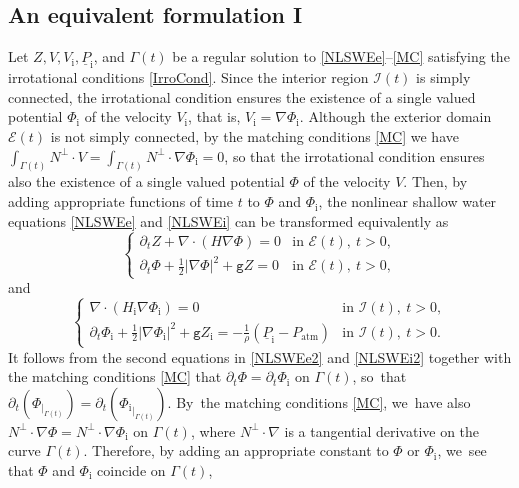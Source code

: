 \documentclass[JEP,XML,SOM,Unicode,NoFloatCountersInSection,published]{cedram}
\newcommand{\gr}{{\mathtt g}}
\newcommand{\dt}{\partial_t}
\newcommand{\cI}{{\mathcal I}}
\newcommand{\cE}{{\mathcal E}}
\newcommand{\ul}[1]{\underline{#1}}
\newcommand{\itGamma}{\mathit{\Gamma}}
\theoremstyle{definition}
\begin{document}
\subsection{An equivalent formulation I}\label{subsect:EF1}
Let $Z,V,V_\mathrm{i},\ul{P}_\mathrm{i}$, and $\itGamma(t)$ be a regular solution to \eqref{NLSWEe}--\eqref{MC} satisfying the irrotational conditions \eqref{IrroCond}.
Since the interior region $\cI(t)$ is simply connected, the irrotational condition ensures the existence of a single valued potential $\Phi_\mathrm{i}$
of the velocity $V_\mathrm{i}$, that is, $V_\mathrm{i}=\nabla\Phi_\mathrm{i}$.
Although the exterior domain $\cE(t)$ is not simply connected, by the matching conditions \eqref{MC} we have
$\int_{\itGamma(t)}N^\perp\cdot V=\int_{\itGamma(t)}N^\perp\cdot\nabla\Phi_\mathrm{i}=0$,
so that the irrotational condition ensures also the existence of a single valued potential $\Phi$ of the velocity $V$.
Then, by adding appropriate functions of time $t$ to $\Phi$ and $\Phi_\mathrm{i}$,
the nonlinear shallow water equations \eqref{NLSWEe} and \eqref{NLSWEi} can be transformed equivalently as
\begin{equation}\label{NLSWEe2}
\begin{cases}
\dt Z+\nabla\cdot(H\nabla\Phi)=0 &\text{in } \cE(t), \ t>0, \\
\dt\Phi + \frac12|\nabla\Phi|^2 + \gr Z = 0 &\text{in } \cE(t), \ t>0,
\end{cases}
\end{equation}
and
\begin{equation}\label{NLSWEi2}
\begin{cases}
\nabla\cdot(H_\mathrm{i}\nabla\Phi_\mathrm{i})=0 &\text{in } \cI(t), \ t>0, \\
\dt\Phi_\mathrm{i} + \frac12|\nabla\Phi_\mathrm{i}|^2 + \gr Z_\mathrm{i} = -\frac{1}{\rho}(\ul{P}_\mathrm{i}-P_\mathrm{atm}) &\text{in } \cI(t), \ t>0.
\end{cases}
\end{equation}
It follows from the second equations in \eqref{NLSWEe2} and \eqref{NLSWEi2} together with the matching conditions \eqref{MC} that
$\dt\Phi=\dt\Phi_\mathrm{i}$ on $\itGamma(t)$, so~that $\dt(\Phi_{\vert_{\itGamma(t)}})=\dt({ \Phi_\mathrm{i} }_{\vert_{\itGamma(t)}})$. By~the matching conditions \eqref{MC}, we~have also $N^\perp\cdot\nabla\Phi=N^\perp\cdot\nabla\Phi_\mathrm{i}$ on $\itGamma(t)$,
where $N^\perp\cdot\nabla$ is a tangential derivative on the curve $\itGamma(t)$.
Therefore, by adding an appropriate constant to $\Phi$ or $\Phi_\mathrm{i}$, we~see that $\Phi$ and $\Phi_\mathrm{i}$ coincide on $\itGamma(t)$,
\end{document}

